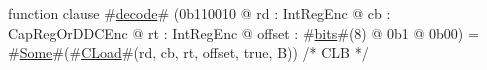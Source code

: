 function clause #\hyperref[zdecode]{decode}# (0b110010 @ rd : IntRegEnc @ cb : CapRegOrDDCEnc @ rt : IntRegEnc @ offset : #\hyperref[zbits]{bits}#(8) @ 0b1 @ 0b00) = #\hyperref[zSome]{Some}#(#\hyperref[zCLoad]{CLoad}#(rd, cb, rt, offset, true,  B)) /* CLB */
